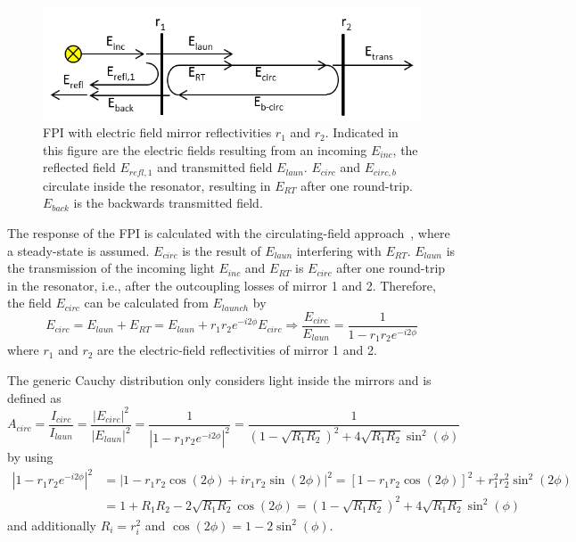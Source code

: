 \begin{figure}[h]
	\centering
	\includegraphics[width=0.7\linewidth]{figures/fabry-perot/Schematic_of_the_Fabry-Perot_interferometer}
	\caption[Fabry Pérot interferometer with electric field mirror reflectivities $r_1$ and $r_2$]{\ac{FPI} with electric field mirror reflectivities $r_1$ and $r_2$.
		Indicated in this figure are the electric fields resulting from an incoming $E_{inc}$, the reflected field $E_{refl,1}$ and transmitted field $E_{laun}$.
		$E_{circ}$ and $E_{circ,b}$ circulate inside the resonator, resulting in $E_{RT}$ after one round-trip. $E_{back}$ is the backwards transmitted field.\cite{noauthor_fabryperot_nodate}}
	\label{fig:schematicofthefabry-perotinterferometer}
\end{figure}
The response of the \ac{FPI} is calculated with the circulating-field approach~\cite{ismail_fabry-perot_2016}, where a steady-state is assumed.
$E_{circ}$ is the result of $E_{laun}$ interfering with $E_{RT}$.
$E_{laun}$ is the transmission of the incoming light $E_{inc}$ and $E_{RT}$ is $E_{circ}$ after one round-trip in the resonator, i.e., after the outcoupling losses of mirror 1 and 2.
Therefore, the field $E_{circ}$ can be calculated from $E_{launch}$ by
\begin{equation}
E_{circ} = E_{laun} + E_{RT} = E_{laun} + r_1 r_2 e^{-i 2 \phi} E_{circ} \Rightarrow \frac{E_{circ}}{E_{laun}} = \frac{1}{1 - r_1 r_2 e^{-i 2 \phi}}
\end{equation}
where $r_1$ and $r_2$ are the electric-field reflectivities of mirror 1 and 2.

The generic Cauchy distribution only considers light inside the mirrors and is defined as
\begin{equation}
A_{circ} = \frac{I_{circ}}{I_{laun}} = \frac{|E_{circ}|^2}{|E_{laun}|^2} = \frac{1}{\left|1 - r_1 r_2 e^{-i2\phi}\right|^2} = \frac{1}{\left(1-\sqrt{R_1 R_2}\right)^2 + 4\sqrt{R_1 R_2} \sin^2(\phi)}
\end{equation}
by using
\begin{align*}
\left|1-r_1 r_2 e^{-i2\phi}\right|^2 &= \left|1- r_1 r_2 \cos(2\phi) + i r_1 r_2 \sin(2\phi)\right|^2 = \left[1-r_1 r_2 \cos(2\phi)\right]^2 + r_1^2 r_2^2 \sin^2(2\phi) \\
 &=1+R_1 R_2 - 2\sqrt{R_1 R_2} \cos(2\phi) = \left(1-\sqrt{R_1 R_2}\right)^2 + 4 \sqrt{R_1 R_2} \sin^2(\phi)
\end{align*}
and additionally $R_i = r_i^2$ and $\cos(2\phi) = 1 -2\sin^2(\phi)$.

